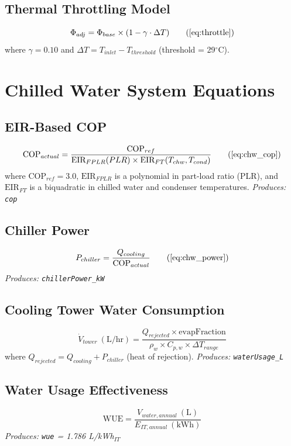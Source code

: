 \documentclass[12pt,a4paper]{report}
\newcommand{\degC}{$^{\circ}$C}
\begin{document}
\subsection{Thermal Throttling Model}
\begin{equation}
\Phi_{adj} = \Phi_{base} \times (1 - \gamma \cdot \Delta T)
\tag{\ref{eq:throttle}}
\end{equation}
where $\gamma = 0.10$ and $\Delta T = T_{inlet} - T_{threshold}$ (threshold = 29\degC).

\section{Chilled Water System Equations}

\subsection{EIR-Based COP}
\begin{equation}
\text{COP}_{actual} = \frac{\text{COP}_{ref}}{\text{EIR}_{FPLR}(PLR) \times \text{EIR}_{FT}(T_{chw}, T_{cond})}
\tag{\ref{eq:chw_cop}}
\end{equation}
where $\text{COP}_{ref} = 3.0$, $\text{EIR}_{FPLR}$ is a polynomial in part-load ratio (PLR),
and $\text{EIR}_{FT}$ is a biquadratic in chilled water and condenser temperatures.
\textit{Produces: \texttt{cop}}

\subsection{Chiller Power}
\begin{equation}
P_{chiller} = \frac{Q_{cooling}}{\text{COP}_{actual}}
\tag{\ref{eq:chw_power}}
\end{equation}
\textit{Produces: \texttt{chillerPower\_kW}}

\subsection{Cooling Tower Water Consumption}
\begin{equation}
\dot{V}_{tower}\ (\text{L/hr}) = \frac{Q_{rejected} \times \text{evapFraction}}{\rho_w \times C_{p,w} \times \Delta T_{range}}
\label{eq:tower_water}
\end{equation}
where $Q_{rejected} = Q_{cooling} + P_{chiller}$ (heat of rejection).
\textit{Produces: \texttt{waterUsage\_L}}

\subsection{Water Usage Effectiveness}
\begin{equation}
\text{WUE} = \frac{V_{water,annual}\ (\text{L})}{E_{IT,annual}\ (\text{kWh})}
\label{eq:wue}
\end{equation}
\textit{Produces: \texttt{wue} = 1.786 L/kWh$_{IT}$}
\end{document}
